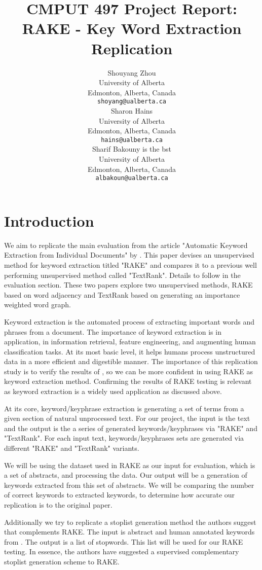 \documentclass[11pt,a4paper]{article}
\title{CMPUT 497 Project Report: \\ RAKE - Key Word Extraction Replication}
\author{Shouyang Zhou \\
  University of Alberta \\
  Edmonton, Alberta, Canada \\
  {\tt shoyang@ualberta.ca} \\\And
  Sharon Hains \\
  University of Alberta \\
  Edmonton, Alberta, Canada \\
  {\tt hains@ualberta.ca} \\\And
  Sharif Bakouny is the bst \\
  University of Alberta \\
  Edmonton, Alberta, Canada \\
  {\tt albakoun@ualberta.ca} \\}
\date{}
\begin{document}
\maketitle

\section{Introduction}

We aim to replicate the main evaluation from the article "Automatic Keyword Extraction from Individual Documents" by \citet{1}. This paper devises an unsupervised method for keyword extraction titled "RAKE" and compares it to a previous well performing unsupervised method called "TextRank". Details to follow in the evaluation section. These two papers explore two unsupervised methods, RAKE based on word adjacency and TextRank based on generating an importance weighted word graph.

Keyword extraction is the automated process of extracting important words and phrases from a document. The importance of keyword extraction is in application, in information retrieval, feature engineering, and augmenting human classification tasks. At its most basic level, it helps humans process unstructured data in a more efficient and digestible manner. The importance of this replication study is to verify the results of \citet{1}, so we can be more confident in using RAKE as keyword extraction method. Confirming the results of RAKE testing is relevant as keyword extraction is a widely used application as discussed above. 

At its core, keyword/keyphrase extraction is generating a set of terms from a given section of natural unprocessed text. For our project, the input is the text and the output is the a series of generated keywords/keyphrases via "RAKE" and "TextRank". For each input text, keywords/keyphrases sets are generated via different "RAKE" and "TextRank" variants.    

We will be using the dataset used in RAKE as our input for evaluation, which is a set of abstracts, and processing the data. Our output will be a generation of keywords extracted from this set of abstracts. We will be comparing the number of correct keywords to extracted keywords, to determine how accurate our replication is to the original paper.

Additionally we try to replicate a stoplist generation method the authors suggest that complements RAKE. The input is abstract and human annotated keywords from \citep{hulth-2003-improved}. The output is a list of stopwords. This list will be used for our RAKE testing. In essence, the authors have suggested a supervised complementary stoplist generation scheme to RAKE. 
\end{document}
